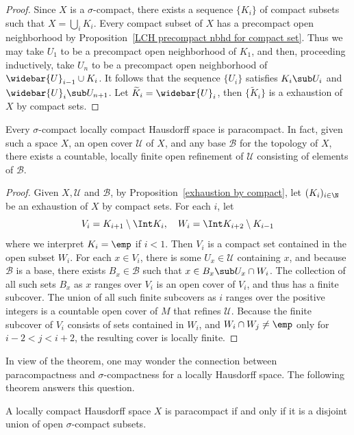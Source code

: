 \begin{proof}
Since $X$ is a $\sigma$-compact, there exists a sequence $\{K_i\}$ of compact subsets such that $X=\bigcup_iK_i$. Every compact subset of $X$ has a precompact open neighborhood by Proposition~\ref{LCH precompact nbhd for compact set}. Thus we may take $U_1$ to be a precompact open neighborhood of $K_1$, and then, proceeding inductively, take $U_n$ to be a precompact open neighborhood of $\widebar{U}_{i-1}\cup K_i$. It follows that the sequence $\{U_i\}$ satisfies $K_i\sub U_i$ and $\widebar{U}_{i}\sub U_{n+1}$. Let $\widetilde{K}_i=\widebar{U}_i$, then $\{\widetilde{K}_i\}$ is a exhaustion of $X$ by compact sets. 
\end{proof}
\begin{theorem}\label{loc compact paracompact}
Every $\sigma$-compact locally compact Hausdorff space is paracompact. In fact, given such a space $X$, an open cover $\mathcal{U}$ of $X$, and any base $\mathcal{B}$ for the topology of $X$, there exists a countable, locally finite open refinement of $\mathcal{U}$ consisting of elements of $\mathcal{B}$.
\end{theorem}
\begin{proof}
Given $X,\mathcal{U}$ and $\mathcal{B}$, by Proposition~\ref{exhaustion by compact}, let $(K_i)_{i\in\N}$ be an exhaustion of $X$ by compact sets. For each $i$, let
\[V_i=K_{i+1}\setminus\Int K_i,\quad W_i=\Int K_{i+2}\setminus K_{i-1}\]
where we interpret $K_i=\emp$ if $i<1$. Then $V_i$ is a compact set contained in the open subset $W_i$. For each $x\in V_i$, there is some $U_x\in\mathcal{U}$ containing $x$, and because $\mathcal{B}$ is a base, there exists $B_x\in\mathcal{B}$ such that $x\in B_x\sub U_x\cap W_i$. The collection of all such sets $B_x$ as $x$ ranges over $V_i$ is an open cover of $V_i$, and thus has a finite subcover. The union of all such finite subcovers as $i$ ranges over the positive integers is a countable open cover of $M$ that refines $\mathcal{U}$. Because the finite subcover of $V_i$ consists of sets contained in $W_i$, and $W_i\cap W_{j}\neq \emp$ only for $i-2<j<i+2$, the resulting cover is locally finite.
\end{proof}
In view of the theorem, one may wonder the connection between paracompactness and $\sigma$-compactness for a locally Hausdorff space. The following theorem answers this question.
\begin{theorem}\label{LCH paracompact iff sigma-compact}
A locally compact Hausdorff space $X$ is paracompact if and only if it is a disjoint union of open $\sigma$-compact subsets.
\end{theorem}

